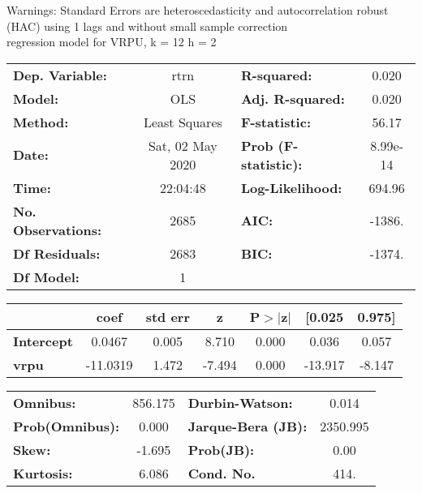 Warnings: \newline
 [1] Standard Errors are heteroscedasticity and autocorrelation robust (HAC) using 1 lags and without small sample correction\\ 

regression model for VRPU, k = 12 h = 2\begin{center}
\begin{tabular}{lclc}
\toprule
\textbf{Dep. Variable:}    &       rtrn       & \textbf{  R-squared:         } &     0.020   \\
\textbf{Model:}            &       OLS        & \textbf{  Adj. R-squared:    } &     0.020   \\
\textbf{Method:}           &  Least Squares   & \textbf{  F-statistic:       } &     56.17   \\
\textbf{Date:}             & Sat, 02 May 2020 & \textbf{  Prob (F-statistic):} &  8.99e-14   \\
\textbf{Time:}             &     22:04:48     & \textbf{  Log-Likelihood:    } &    694.96   \\
\textbf{No. Observations:} &        2685      & \textbf{  AIC:               } &    -1386.   \\
\textbf{Df Residuals:}     &        2683      & \textbf{  BIC:               } &    -1374.   \\
\textbf{Df Model:}         &           1      & \textbf{                     } &             \\
\bottomrule
\end{tabular}
\begin{tabular}{lcccccc}
                   & \textbf{coef} & \textbf{std err} & \textbf{z} & \textbf{P$> |$z$|$} & \textbf{[0.025} & \textbf{0.975]}  \\
\midrule
\textbf{Intercept} &       0.0467  &        0.005     &     8.710  &         0.000        &        0.036    &        0.057     \\
\textbf{vrpu}      &     -11.0319  &        1.472     &    -7.494  &         0.000        &      -13.917    &       -8.147     \\
\bottomrule
\end{tabular}
\begin{tabular}{lclc}
\textbf{Omnibus:}       & 856.175 & \textbf{  Durbin-Watson:     } &    0.014  \\
\textbf{Prob(Omnibus):} &   0.000 & \textbf{  Jarque-Bera (JB):  } & 2350.995  \\
\textbf{Skew:}          &  -1.695 & \textbf{  Prob(JB):          } &     0.00  \\
\textbf{Kurtosis:}      &   6.086 & \textbf{  Cond. No.          } &     414.  \\
\bottomrule
\end{tabular}
\end{center}

